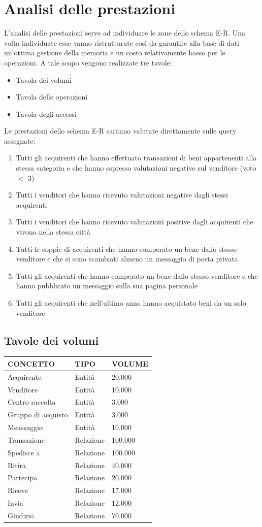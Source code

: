 \documentclass[a4paper, 10pt]{report}
\begin{document}
\chapter{Analisi delle prestazioni}
L'analisi delle prestazioni serve ad individuare le zone dello schema E-R. Una volta individuate esse vanno ristrutturate così da garantire alla base di dati un'ottima gestione della memoria e un costo relativamente basso per le operazioni.
A tale scopo vengono realizzate tre tavole:
\begin{itemize}
\item Tavola dei volumi
\item Tavola delle operazioni
\item Tavola degli accessi
\end {itemize}
Le prestazioni dello schema E-R saranno valutate direttamente sulle query assegnate:
\begin{enumerate}
\item Tutti gli acquirenti che hanno effettuato transazioni di beni appartenenti alla stessa categoria e che hanno espresso valutazioni negative sul venditore (voto $<$ 3)
\item Tutti i venditori che hanno ricevuto valutazioni negative dagli stessi acquirenti
\item Tutti i venditori che hanno ricevuto valutazioni positive dagli acquirenti che vivono nella stessa citt\`a
\item Tutti le coppie di acquirenti che hanno comperato un bene dallo stesso venditore e che si sono scambiati almeno un messaggio di posta privata
\item Tutti gli acquirenti che hanno comperato un bene dallo stesso venditore e che hanno pubblicato un messaggio sulla sua pagina personale
\item Tutti gli acquirenti che nell’ultimo anno hanno acquistato beni da un solo venditore
\end{enumerate}
\newpage
\section{Tavole dei volumi}
\begin{longtable}[!h]{|l|l|l|}
\hline
\textbf{CONCETTO}&\textbf{TIPO}&\textbf{VOLUME}\\
\hline
Acquirente & Entit\`a & 20.000 \\
\hline
Venditore & Entit\`a & 10.000 \\
\hline
Centro raccolta & Entit\`a & 3.000 \\
\hline
Gruppo di acquisto & Entit\`a & 3.000 \\
\hline
Meassaggio & Entit\`a & 10.000 \\
\hline
Transazione & Relazione & 100.000 \\
\hline
Spedisce a & Relazione & 100.000 \\
\hline
Ritira & Relazione & 40.000 \\
\hline
Partecipa & Relazione & 20.000 \\
\hline
Riceve & Relazione & 17.000 \\
\hline
Invia & Relazione & 12.000 \\
\hline
Giudizio & Relazione & 70.000 \\
\hline
\end{longtable}
\end{document}

